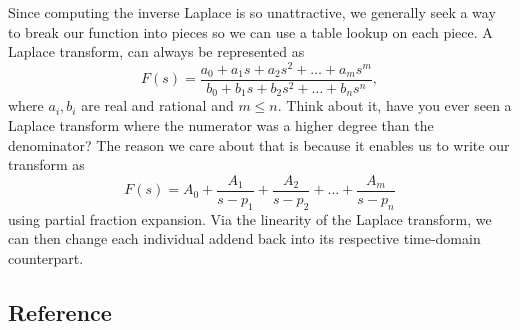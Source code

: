 \documentclass[nobib]{tufte-handout}
\begin{document}
Since computing the inverse Laplace 
is so unattractive, we generally 
seek a way to break our function
into pieces so we can use a table 
lookup on each piece. 
A Laplace transform, can always be represented as 
\[F(s) = \frac{a_0 + a_1s + a_2s^2 + \dots + a_m s^m}{b_0 + b_1s + b_2s^2 + \dots + b_n s^n},\]
where $a_i, b_i$ are real and rational
and $m \leq n$. Think about it, have 
you ever seen a Laplace transform 
where the numerator was a higher
degree than the denominator? 
The reason we care about that is because it
enables us to write our transform as 
\[F(s) = A_0 + \frac{A_1}{s-p_1}+\frac{A_2}{s-p_2}+\dots+\frac{A_m}{s-p_n}\]
using partial fraction expansion. Via 
the linearity of the Laplace transform, 
we can then change each individual addend 
back into its respective time-domain counterpart. 

\subsection{Reference}
\end{document}
